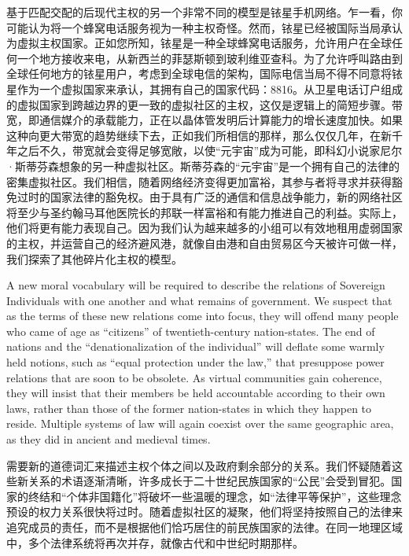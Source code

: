 \begin{Parallel}{97mm}{45mm}
  \ParallelRText
  {\small 基于匹配交配的后现代主权的另一个非常不同的模型是铱星手机网络。乍一看，你可能认为将一个蜂窝电话服务视为一种主权奇怪。然而，铱星已经被国际当局承认为虚拟主权国家。正如您所知，铱星是一种全球蜂窝电话服务，允许用户在全球任何一个地方接收来电，从新西兰的菲瑟斯顿到玻利维亚查科​​。为了允许呼叫路由到全球任何地方的铱星用户，考虑到全球电信的架构，国际电信当局不得不同意将铱星作为一个虚拟国家来承认，其拥有自己的国家代码：8816。从卫星电话订户组成的虚拟国家到跨越边界的更一致的虚拟社区的主权，这仅是逻辑上的简短步骤。带宽，即通信媒介的承载能力，正在以晶体管发明后计算能力的增长速度加快。如果这种向更大带宽的趋势继续下去，正如我们所相信的那样，那么仅仅几年，在新千年之后不久，带宽就会变得足够宽敞，以使“元宇宙”成为可能，即科幻小说家尼尔·斯蒂芬森想象的另一种虚拟社区。斯蒂芬森的“元宇宙”是一个拥有自己的法律的密集虚拟社区。我们相信，随着网络经济变得更加富裕，其参与者将寻求并获得豁免过时的国家法律的豁免权。由于具有广泛的通信和信息战争能力，新的网络社区将至少与圣约翰马耳他医院长的邦联一样富裕和有能力推进自己的利益。实际上，他们将更有能力表现自己。因为我们认为越来越多的小组可以有效地租用虚弱国家的主权，并运营自己的经济避风港，就像自由港和自由贸易区今天被许可做一样，我们探索了其他碎片化主权的模型。}

  \ParallelPar
  \ParallelLText
  {A new moral vocabulary will be required to describe the relations of Sovereign Individuals with one another and what remains of government. We suspect that as the terms of these new relations come into focus, they will offend many people who came of age as “citizens” of twentieth-century nation-states. The end of nations and the “denationalization of the individual” will deflate some warmly held notions, such as “equal protection under the law,” that presuppose power relations that are soon to be obsolete. As virtual communities gain coherence, they will insist that their members be held accountable according to their own laws, rather than those of the former nation-states in which they happen to reside. Multiple systems of law will again coexist over the same geographic area, as they did in ancient and medieval times.}
  
  \ParallelRText
  {\small 需要新的道德词汇来描述主权个体之间以及政府剩余部分的关系。我们怀疑随着这些新关系的术语逐渐清晰，许多成长于二十世纪民族国家的“公民”会受到冒犯。国家的终结和“个体非国籍化”将破坏一些温暖的理念，如“法律平等保护”，这些理念预设的权力关系很快将过时。随着虚拟社区的凝聚，他们将坚持按照自己的法律来追究成员的责任，而不是根据他们恰巧居住的前民族国家的法律。在同一地理区域中，多个法律系统将再次并存，就像古代和中世纪时期那样。}


\end{Parallel}
